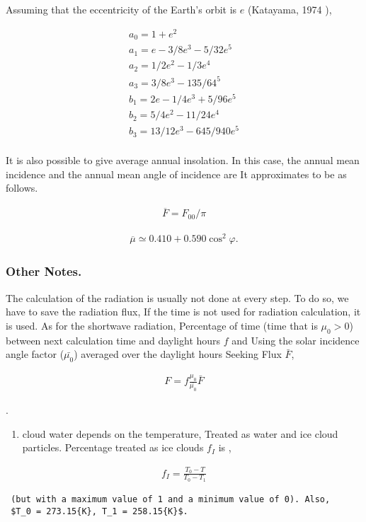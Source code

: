 Assuming that the eccentricity of the Earth's orbit is \(e\) (Katayama,
1974 ),

\begin{eqnarray}
   a_0  =   1 + e^2 \\
   a_1  =   e - 3/8 e^3 - 5/32 e^5 \\
   a_2  =   1/2 e^2 - 1/3e^4 \\
   a_3  =   3/8 e^3 - 135/64^5 \\
   b_1  =  2e - 1/4 e^3 + 5/96 e^5 \\
   b_2  =  5/4 e^2 - 11/24 e^4 \\
   b_3  =  13/12 e^3 - 645/940 e^5 \\
\end{eqnarray}

It is also possible to give average annual insolation. In this case, the
annual mean incidence and the annual mean angle of incidence are It
approximates to be as follows.

\begin{eqnarray}
\overline{F} = F_{00}/\pi
\end{eqnarray}

\begin{eqnarray}
\overline{\mu} \simeq 0.410 + 0.590 \cos^2 \varphi .
\end{eqnarray}

\hypertarget{other-notes.}{%
\subsubsection{Other Notes.}\label{other-notes.}}

The calculation of the radiation is usually not done at every step. To
do so, we have to save the radiation flux, If the time is not used for
radiation calculation, it is used. As for the shortwave radiation,
Percentage of time (time that is \(\mu_0>0\)) between next calculation
time and daylight hours \(f\) and Using the solar incidence angle factor
(\(\bar{\mu_0}\)) averaged over the daylight hours Seeking Flux
\(\bar{F}\),

\begin{eqnarray}
        F =  f \frac{\mu_0}{\bar{\mu_0}} \bar{F}
\end{eqnarray}

.

\begin{enumerate}
\def\labelenumi{\arabic{enumi}.}
\setcounter{enumi}{1}
\tightlist
\item
  cloud water depends on the temperature, Treated as water and ice cloud
  particles. Percentage treated as ice clouds \(f_I\) is ,
\end{enumerate}

\begin{eqnarray}
        f_I = \frac{ T_0 - T }{ T_0 - T_1 }
\end{eqnarray}

\begin{verbatim}
 (but with a maximum value of 1 and a minimum value of 0). Also,
 $T_0 = 273.15{K}, T_1 = 258.15{K}$.
\end{verbatim}
